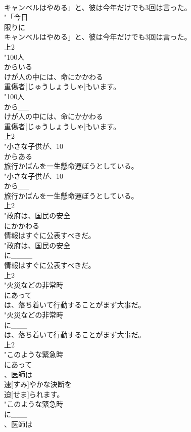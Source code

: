 \documentclass[8pt]{extreport}
\begin{document}
\begin{CJK}{UTF8}{min}
\\	キャンベルはやめる」と、彼は今年だけでも3回は言った。
\\	"「今日
\\	限りに
\\	キャンベルはやめる」と、彼は今年だけでも3回は言った。
\\	上2
\\	"100人
\\	からいる
\\	けが人の中には、命にかかわる
\\	重傷者[じゅうしょうしゃ]もいます。
\\	"100人
\\	から__
\\	けが人の中には、命にかかわる
\\	重傷者[じゅうしょうしゃ]もいます。
\\	上2
\\	"小さな子供が、10
\\	からある
\\	旅行かばんを一生懸命運ぼうとしている。
\\	"小さな子供が、10
\\	から__
\\	旅行かばんを一生懸命運ぼうとしている。
\\	上2
\\	"政府は、国民の安全
\\	にかかわる
\\	情報はすぐに公表すべきだ。
\\	"政府は、国民の安全
\\	に____
\\	情報はすぐに公表すべきだ。
\\	上2
\\	"火災などの非常時
\\	にあって
\\	は、落ち着いて行動することがまず大事だ。
\\	"火災などの非常時
\\	に___
\\	は、落ち着いて行動することがまず大事だ。
\\	上2
\\	"このような緊急時
\\	にあって
\\	、医師は
\\	速[すみ]やかな決断を
\\	迫[せま]られます。
\\	"このような緊急時
\\	に___
\\	、医師は

\end{CJK}
\end{document}
